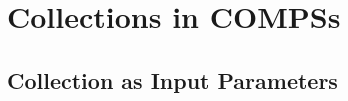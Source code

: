 \section{Collections in COMPSs}
\label{sec:col}


\subsection{Collection as Input Parameters}
\label{subsec:col_in}
